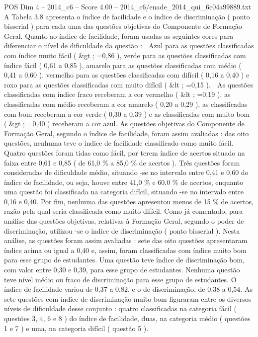 \begin{textsample}{POS Dim 4 – 2014\_c6 – Score 4.00 – 2014\_c6/enade\_2014\_qui\_6c04a99889.txt}
A Tabela 3.8 apresenta o índice de facilidade e o índice de discriminação ( ponto bisserial ) para cada uma das questões objetivas do Componente de Formação Geral.
Quanto ao índice de facilidade, foram usadas as seguintes cores para diferenciar o nível de dificuldade da questão :  Azul para as questões classificadas com índice muito fácil ( \&gt ; =0,86 ), verde para as questões classificadas com índice fácil ( 0,61 a 0,85 ), amarelo para as questões classificadas com médio ( 0,41 a 0,60 ), vermelho para as questões classificadas com difícil ( 0,16 a 0,40 ) e roxo para as questões classificadas com muito difícil ( \&lt ; =0,15 ).  As questões classificadas com índice fraco receberam a cor vermelho ( \&lt ; =0,19 ), as classificadas com médio receberam a cor amarelo ( 0,20 a 0,29 ), as classificadas com bom receberam a cor verde ( 0,30 a 0,39 ) e as classificadas com muito bom ( \&gt ; =0,40 ) receberam a cor azul.
As questões objetivas do Componente de Formação Geral, segundo o índice de facilidade, foram assim avaliadas : das oito questões, nenhuma teve o índice de facilidade classificado como muito fácil.
Quatro questões foram tidas como fácil, por terem índice de acertos situado na faixa entre 0,61 e 0,85 ( de 61,0 \% a 85,0 \% de acertos ).
Três questões foram consideradas de dificuldade médio, situando -se no intervalo entre 0,41 e 0,60 do índice de facilidade, ou seja, houve entre 41,0 \% e 60,0 \% de acertos, enquanto uma questão foi classificada na categoria difícil, situando -se no intervalo entre 0,16 e 0,40.
Por fim, nenhuma das questões apresentou menos de 15 \% de acertos, razão pela qual seria classificada como muito difícil.
Como já comentado, para análise das questões objetivas, relativas à Formação Geral, segundo o poder de discriminação, utilizou -se o índice de discriminação ( ponto bisserial ).
Nesta análise, as questões foram assim avaliadas : sete das oito questões apresentaram índice acima ou igual a 0,40 e, assim, foram classificadas com índice muito bom para esse grupo de estudantes.
Uma questão teve índice de discriminação bom, com valor entre 0,30 e 0,39, para esse grupo de estudantes.
Nenhuma questão teve nível médio ou fraco de discriminação para esse grupo de estudantes.
O índice de facilidade variou de 0,37 a 0,82, e o de discriminação, de 0,38 a 0,54.
As sete questões com índice de discriminação muito bom figuraram entre os diversos níveis de dificuldade desse conjunto : quatro classificadas na categoria fácil ( questões 3, 4, 6 e 8 ) do índice de facilidade, duas, na categoria médio ( questões 1 e 7 ) e uma, na categoria difícil ( questão 5 ).

\end{textsample}
